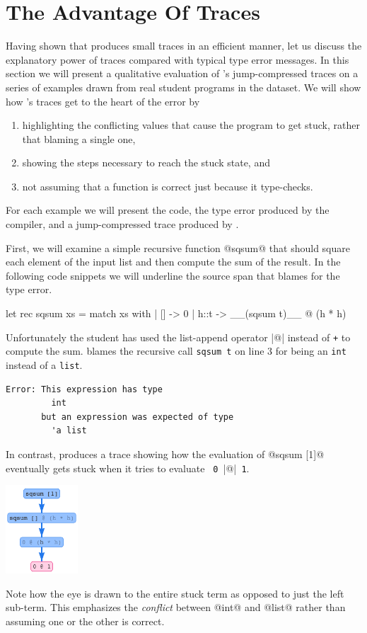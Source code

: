 \section{The Advantage Of Traces}
\label{sec:advantage-traces}
Having shown that \toolname produces small traces in an efficient
manner, let us discuss the explanatory power of traces compared with
typical type error messages. In this section we will present a
qualitative evaluation of \toolname's jump-compressed traces on a series
of examples drawn from real student programs in the \ucsdbench
dataset. We will show how \toolname's traces get to the heart of the
error by
%
\begin{enumerate}
\item highlighting the conflicting values that cause the program to get
  stuck, rather that blaming a single one,
\item showing the steps necessary to reach the stuck state, and
\item not assuming that a function is correct just because it type-checks.
\end{enumerate}
%
For each example we will present the code, the type error produced by
the \ocaml compiler, and a jump-compressed trace produced by \toolname.


First, we will examine a simple recursive function @sqsum@ that should
square each element of the input list and then compute the sum of the
result. In the following code snippets we will underline the source span
that \ocaml blames for the type error.
%
\begin{ecode}
let rec sqsum xs = match xs with
  | [] -> 0
  | h::t -> __(sqsum t)__ @ (h * h)
\end{ecode}
%
Unfortunately the student has used the list-append operator |@| instead
of \texttt{+} to compute the sum. \ocaml blames the recursive call
\texttt{sqsum t} on line 3 for being an \texttt{int} instead of a
\texttt{list}.
%
\begin{verbatim}
Error: This expression has type
         int
       but an expression was expected of type
         'a list
\end{verbatim}
%
In contrast, \toolname produces a trace showing how the evaluation of
@sqsum [1]@ eventually gets stuck when it tries to evaluate
\texttt{ 0 }|@|\texttt{ 1}.
%
\begin{center}
  \includegraphics[height=125px]{sqsum.png}
\end{center}
%
Note how the eye is drawn to the entire stuck term as opposed to just
the left sub-term. This emphasizes the \emph{conflict} between @int@ and
@list@ rather than assuming one or the other is correct.

